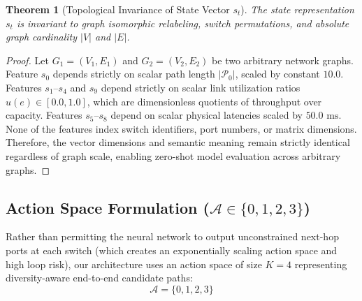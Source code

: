 \documentclass[12pt,a4paper,oneside]{report}
\newtheorem{theorem}{Theorem}[chapter]
\begin{document}
\begin{theorem}[Topological Invariance of State Vector $s_t$]
The state representation $s_t$ is invariant to graph isomorphic relabeling, switch permutations, and absolute graph cardinality $|V|$ and $|E|$.
\end{theorem}

\begin{proof}
Let $G_1 = (V_1, E_1)$ and $G_2 = (V_2, E_2)$ be two arbitrary network graphs. Feature $s_0$ depends strictly on scalar path length $|\mathcal{P}_0|$, scaled by constant $10.0$. Features $s_1$--$s_4$ and $s_9$ depend strictly on scalar link utilization ratios $u(e) \in [0.0, 1.0]$, which are dimensionless quotients of throughput over capacity. Features $s_5$--$s_8$ depend on scalar physical latencies scaled by $50.0\text{ ms}$. None of the features index switch identifiers, port numbers, or matrix dimensions. Therefore, the vector dimensions and semantic meaning remain strictly identical regardless of graph scale, enabling zero-shot model evaluation across arbitrary graphs.
\end{proof}

\subsection{Action Space Formulation ($\mathcal{A} \in \{0, 1, 2, 3\}$)}
Rather than permitting the neural network to output unconstrained next-hop ports at each switch (which creates an exponentially scaling action space and high loop risk), our architecture uses an action space of size $K=4$ representing diversity-aware end-to-end candidate paths:
\begin{equation}
    \mathcal{A} = \{0, 1, 2, 3\}
\end{equation}
\end{document}
